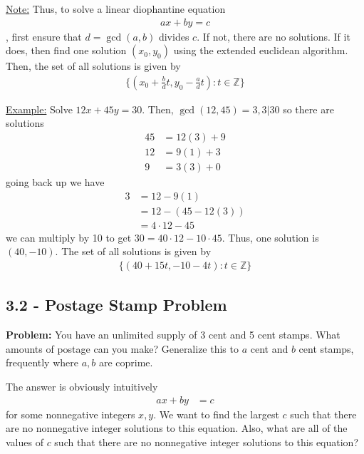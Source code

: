 \documentclass{article}
\newcommand*{\zz}{\mathbb{Z}}%
\begin{document}
\underline{Note:} Thus, to solve a linear diophantine equation \begin{align*}
    ax+by=c
\end{align*}, first ensure that $d=\gcd(a,b)$ divides $c$. If not, there are no solutions. If it does, then find one solution $(x_0,y_0)$ using the extended euclidean algorithm. Then, the set of all solutions is given by \begin{align*}
    \{ (x_0 + \frac{b}{d}t, y_0 - \frac{a}{d}t) : t\in \zz \}
\end{align*}

\underline{Example:} Solve $12x+45y=30$. Then, $\gcd(12,45)=3, 3|30$ so there are solutions \begin{align*}
    45 &= 12(3)+9\\
    12 &= 9(1)+3 \\
    9 &= 3(3)+0
\end{align*}
going back up we have \begin{align*}
    3 &= 12 - 9(1) \\
      &= 12 - (45 - 12(3)) \\
      &= 4\cdot 12 - 45
\end{align*}
we can multiply by 10 to get $30 = 40\cdot 12 - 10\cdot 45$. Thus, one solution is $(40,-10)$. The set of all solutions is given by \begin{align*}
    \{ (40 + 15t, -10 - 4t) : t\in \zz \}
\end{align*}

\subsection{3.2 - Postage Stamp Problem}

\textbf{Problem:} You have an unlimited supply of 3 cent and 5 cent stamps. What amounts of postage can you make? Generalize this to $a$ cent and $b$ cent stamps, frequently where $a,b$ are coprime.

The answer is obviously intuitively \begin{align*}
    ax+by&=c
\end{align*} for some nonnegative integers $x,y$. We want to find the largest $c$ such that there are no nonnegative integer solutions to this equation. Also, what are all of the values of $c$ such that there are no nonnegative integer solutions to this equation?
\end{document}
